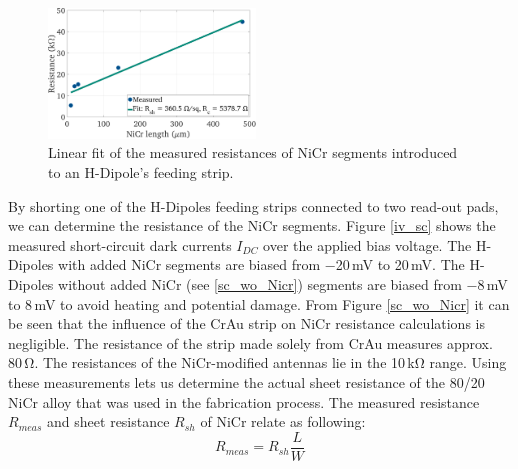
\begin{figure} %
    \centering
    \includegraphics[width=0.49\textwidth]{figures/R_sheet_regression.pdf}
    \captionsetup{width=0.475\textwidth} %
    \caption{Linear fit of the measured resistances of NiCr segments introduced to an H-Dipole's feeding strip.}
    \label{fig:Rsheet:reg}
\end{figure}

By shorting one of the H-Dipoles feeding strips connected to two read-out pads, we can determine the resistance of the NiCr segments. Figure \ref{iv_sc} shows the measured short-circuit dark currents $I_{DC}$ over the applied bias voltage. The H-Dipoles with added NiCr segments are biased from \num{-20}\,\si{\milli \volt} to \num{20}\,\si{\milli \volt}. The H-Dipoles without added NiCr (see \ref{sc_wo_Nicr}) segments are biased from \num{-8}\,\si{\milli \volt} to \num{8}\,\si{\milli \volt} to avoid heating and potential damage. From Figure \ref{sc_wo_Nicr} it can be seen that the influence of the CrAu strip on NiCr resistance calculations is negligible. The resistance of the strip made solely from CrAu measures approx. \num{80}\,\si{\ohm}. The resistances of the NiCr-modified antennas lie in the \num{10}\,\si{\kilo \ohm} range. Using these measurements lets us determine the actual sheet resistance of the \num{80}/\num{20} NiCr alloy that was used in the fabrication process. The measured resistance $R_{meas}$ and sheet resistance $R_{sh}$ of NiCr relate as following: 
\begin{equation}
    R_{meas} = R_{sh}\frac{L}{W}
\end{equation}


